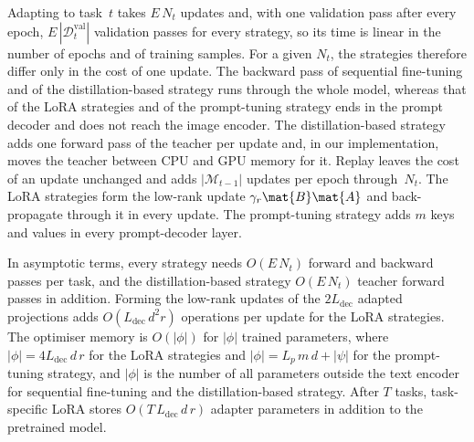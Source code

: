 Adapting to task~$t$ takes $E\,N_t$ updates and, with one validation pass after every epoch, $E\,|\mathcal{D}_t^{\mathrm{val}}|$ validation passes for every strategy, so its time is linear in the number of epochs and of training samples.
For a given $N_t$, the strategies therefore differ only in the cost of one update.
The backward pass of sequential fine-tuning and of the distillation-based strategy runs through the whole model, whereas that of the LoRA strategies and of the prompt-tuning strategy ends in the prompt decoder and does not reach the image encoder.
The distillation-based strategy adds one forward pass of the teacher per update and, in our implementation, moves the teacher between CPU and GPU memory for it.
Replay leaves the cost of an update unchanged and adds $|\mathcal{M}_{t-1}|$ updates per epoch through~$N_t$.
The LoRA strategies form the low-rank update $\gamma_r\mat{B}\mat{A}$ and back-propagate through it in every update.
The prompt-tuning strategy adds $m$ keys and values in every prompt-decoder layer.

In asymptotic terms, every strategy needs $O(E\,N_t)$ forward and backward passes per task, and the distillation-based strategy $O(E\,N_t)$ teacher forward passes in addition.
Forming the low-rank updates of the $2L_{\mathrm{dec}}$ adapted projections adds $O(L_{\mathrm{dec}}\,d^2 r)$ operations per update for the LoRA strategies.
The optimiser memory is $O(|\phi|)$ for $|\phi|$ trained parameters, where $|\phi| = 4 L_{\mathrm{dec}}\,d\,r$ for the LoRA strategies and $|\phi| = L_p\,m\,d + |\psi|$ for the prompt-tuning strategy, and $|\phi|$ is the number of all parameters outside the text encoder for sequential fine-tuning and the distillation-based strategy.
After $T$ tasks, task-specific LoRA stores $O(T\,L_{\mathrm{dec}}\,d\,r)$ adapter parameters in addition to the pretrained model.

